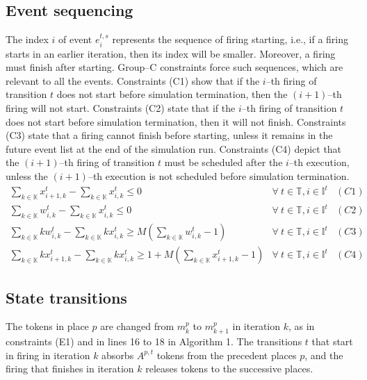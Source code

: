\documentclass[suppldata]{interact}
\theoremstyle{plain}
\theoremstyle{definition}
\theoremstyle{remark}
\begin{document}
\subsection{Event sequencing}
The index $i$ of event $e^{t,s}_i$ represents the sequence of firing starting, i.e., if a firing starts in an earlier iteration, then its index will be smaller. Moreover, a firing must finish after starting. Group--C constraints force such sequences, which are relevant to all the events. Constraints (C1) show that if the $i$--th firing of transition $t$ does not start before simulation termination, then the $(i+1)$--th firing will not start. Constraints (C2) state that if the $i$--th firing of transition $t$ does not start before simulation termination, then it will not finish. Constraints (C3) state that a firing cannot finish before starting, unless it remains in the future event list at the end of the simulation run. Constraints (C4) depict that the $(i+1)$--th firing of transition $t$ must be scheduled after the $i$--th execution, unless the $(i+1)$--th execution is not scheduled before simulation termination.
\begin{eqnarray}
	\sum_{k\in \mathbb{K}} x^{t}_{i+1,k} - \sum_{k\in \mathbb{K}} x^{t}_{i,k} \le 0&  \forall\ t\in \mathbb{T},i\in \mathbb{I}^{t}&(C1)\nonumber\\
	\sum_{k\in \mathbb{K}} w^{t}_{i,k}-\sum_{k\in \mathbb{K}} x^{t}_{i,k} \le 0&  \forall\ t\in \mathbb{T},i\in \mathbb{I}^{t}&(C2)\nonumber\\
	\sum_{k\in \mathbb{K}} kw^{t}_{i,k} - \sum_{k\in \mathbb{K}} kx^{t}_{i,k} \ge M(\sum_{k\in \mathbb{K}} w^{t}_{i,k}-1) &\forall\ t\in \mathbb{T}, i\in \mathbb{I}^{t}&(C3) \nonumber\\
	\sum_{k\in \mathbb{K}} kx^{t}_{i+1,k} - \sum_{k\in \mathbb{K}} kx^{t}_{i,k} \ge 1+M(\sum_{k\in \mathbb{K}} x^{t}_{i+1,k}-1)&  \forall\ t\in \mathbb{T},i\in \mathbb{I}^{t}&(C4)\nonumber
\end{eqnarray}

\subsection{State transitions}

The tokens in place $p$ are changed from $m^{p}_{k}$ to $m^{p}_{k+1}$ in iteration $k$, as in constraints (E1) and in lines 16 to 18 in Algorithm 1. The transitions $t$ that start in %
firing in iteration $k$ absorbs $A^{p,t}$ tokens from the precedent places $p$, and the firing that finishes in iteration $k$ releases tokens to the successive places. 
\end{document}
